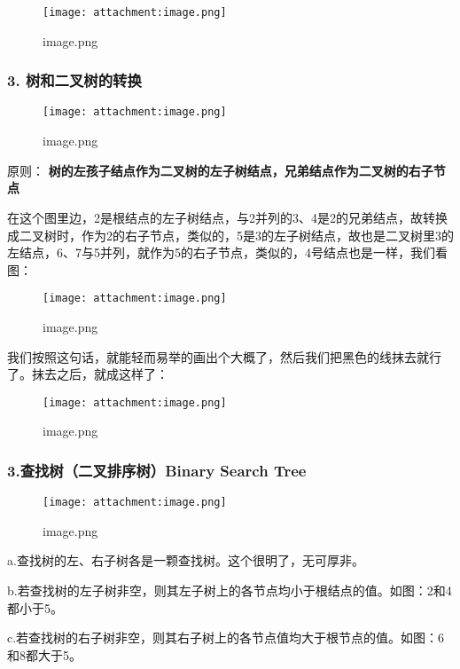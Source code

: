 \documentclass[11pt]{article}
\makeatletter
\def\maxwidth{\ifdim\Gin@nat@width>\linewidth\linewidth
    \else\Gin@nat@width\fi}
\let\Oldincludegraphics\includegraphics
\renewcommand{\includegraphics}[1]{\Oldincludegraphics[width=.8\maxwidth]{#1}}
\makeatother
\begin{document}
\begin{figure}
\centering
\texttt{[image: attachment:image.png]}
\caption{image.png}
\end{figure}

    \subsubsection{3.
树和二叉树的转换}\label{ux6811ux548cux4e8cux53c9ux6811ux7684ux8f6cux6362}

    \begin{figure}
\centering
\texttt{[image: attachment:image.png]}
\caption{image.png}
\end{figure}

原则：
\textbf{树的左孩子结点作为二叉树的左子树结点，兄弟结点作为二叉树的右子节点}

    在这个图里边，2是根结点的左子树结点，与2并列的3、4是2的兄弟结点，故转换成二叉树时，作为2的右子节点，类似的，5是3的左子树结点，故也是二叉树里3的左结点，6、7与5并列，就作为5的右子节点，类似的，4号结点也是一样，我们看图：

\begin{figure}
\centering
\texttt{[image: attachment:image.png]}
\caption{image.png}
\end{figure}

    我们按照这句话，就能轻而易举的画出个大概了，然后我们把黑色的线抹去就行了。抹去之后，就成这样了：

\begin{figure}
\centering
\texttt{[image: attachment:image.png]}
\caption{image.png}
\end{figure}

    \subsubsection{3.查找树（二叉排序树）Binary Search
Tree}\label{ux67e5ux627eux6811ux4e8cux53c9ux6392ux5e8fux6811binary-search-tree}

\begin{figure}
\centering
\texttt{[image: attachment:image.png]}
\caption{image.png}
\end{figure}

a.查找树的左、右子树各是一颗查找树。这个很明了，无可厚非。

b.若查找树的左子树非空，则其左子树上的各节点均小于根结点的值。如图：2和4都小于5。

c.若查找树的右子树非空，则其右子树上的各节点值均大于根节点的值。如图：6和8都大于5。
\end{document}
